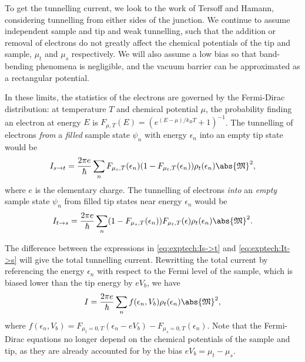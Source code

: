 To get the tunnelling current, we look to the work of Tersoff and Hamann, considering tunnelling from either sides of the junction. We continue to assume independent sample and tip and weak tunnelling, such that the addition or removal of electrons do not greatly affect the chemical potentials of the tip and sample, $\mu_t$ and $\mu_s$ respectively. We will also assume a low bias so that band-bending phenomena is negligible, and the vacuum barrier can be approximated as a rectangular potential.

In these limits, the statistics of the electrons are governed by the Fermi-Dirac distribution: at temperature $T$ and chemical potential $\mu$, the probability finding an electron at energy $E$ is $F_{\mu, T}(E) = ({e^{(E-\mu)/k_BT} +1})^{-1}$. The tunnelling of electrons \emph{from} a \emph{filled} sample state $\psi_n$ with energy $\epsilon_n$ into an empty tip state would be
\begin{equation} \label{eq:exptech:Is->t}
    I_{s\rightarrow t} = \frac{2\pi e}{\hbar} \sum_n F_{\mu_s, T}(\epsilon_n) (1-F_{\mu_t, T}(\epsilon_n))  \rho_{t}(\epsilon_n) \abs{\mathfrak{M}}^2 ,
\end{equation}
where $e$ is the elementary charge. The tunnelling of electrons \emph{into} an \emph{empty} sample state $\psi_n$ from filled tip states near energy $\epsilon_n$ would be 
\begin{equation} \label{eq:exptech:It->s}
    I_{t\rightarrow s} = \frac{2\pi e}{\hbar} \sum_n (1-F_{\mu_s, T}(\epsilon_n))   F_{\mu_t, T}(\epsilon)  \rho_{t}(\epsilon_n) \abs{\mathfrak{M}}^2 .
\end{equation}

The difference between the expressions in \autoref{eq:exptech:Is->t} and \ref{eq:exptech:It->s} will give the total tunnelling current. Rewritting the total current by referencing the energy $\epsilon_n$ with respect to the Fermi level of the sample, which is biased lower than the tip energy by $eV_b$, we have
\begin{equation} 
I = \frac{2\pi e}{\hbar}\sum_n f(\epsilon_n, V_b) \rho_{t}(\epsilon_n) \abs{\mathfrak{M}}^2,
\end{equation}
where $ f(\epsilon_n,V_b) = F_{\mu_t=0,T}(\epsilon_n-eV_b) - F_{\mu_s=0,T}(\epsilon_n)$. Note that the Fermi-Dirac equations no longer depend on the chemical potentials of the sample and tip, as they are already accounted for by the bias $eV_b = \mu_t - \mu_s$. 


